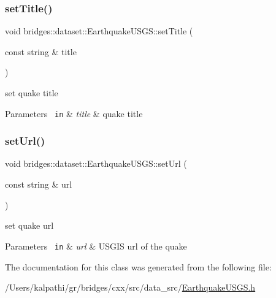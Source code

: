 \subsubsection{\texorpdfstring{setTitle()}{setTitle()}}
{\footnotesize\ttfamily void bridges\+::dataset\+::\+Earthquake\+U\+S\+G\+S\+::set\+Title (\begin{DoxyParamCaption}\item[{const string \&}]{title }\end{DoxyParamCaption})\hspace{0.3cm}{\ttfamily [inline]}}



set quake title 


\begin{DoxyParams}[1]{Parameters}
\mbox{\texttt{ in}}  & {\em title} & quake title \\
\hline
\end{DoxyParams}
\mbox{\label{classbridges_1_1dataset_1_1_earthquake_u_s_g_s_aecb3cb7e4dba2315fed2a4a316a1fac9}} 
\subsubsection{\texorpdfstring{setUrl()}{setUrl()}}
{\footnotesize\ttfamily void bridges\+::dataset\+::\+Earthquake\+U\+S\+G\+S\+::set\+Url (\begin{DoxyParamCaption}\item[{const string \&}]{url }\end{DoxyParamCaption})\hspace{0.3cm}{\ttfamily [inline]}}



set quake url 


\begin{DoxyParams}[1]{Parameters}
\mbox{\texttt{ in}}  & {\em url} & U\+S\+G\+IS url of the quake \\
\hline
\end{DoxyParams}


The documentation for this class was generated from the following file\+:\begin{DoxyCompactItemize}
\item 
/\+Users/kalpathi/gr/bridges/cxx/src/data\+\_\+src/\mbox{\hyperlink{_earthquake_u_s_g_s_8h}{Earthquake\+U\+S\+G\+S.\+h}}\end{DoxyCompactItemize}
